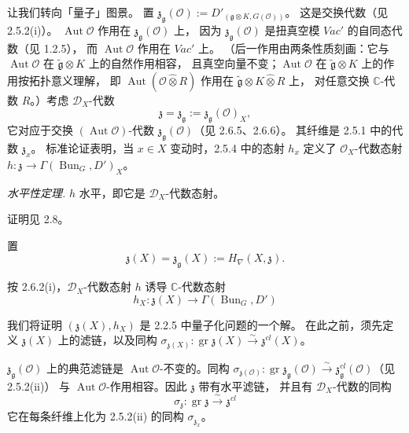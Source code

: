  让我们转向「量子」图景。
置 $\mathfrak{z}_{\mathfrak{g}}(\mathcal{O}):=D'_{(\mathfrak{g}\otimes K,G(\mathcal{O}))}$。
这是交换代数（见 2.5.2(i)）。
$\operatorname{Aut}\mathcal{O}$ 作用在 $\mathfrak{z}_{\mathfrak{g}}(\mathcal{O})$ 上，
因为 $\mathfrak{z}_{\mathfrak{g}}(\mathcal{O})$ 是扭真空模 $\mathit{Vac}'$ 的自同态代数（见 1.2.5），
而 $\operatorname{Aut}\mathcal{O}$ 作用在 $\mathit{Vac}'$ 上。
（后一作用由两条性质刻画：它与 $\operatorname{Aut}\mathcal{O}$ 在 $\tilde{\mathfrak{g}}\otimes K$ 上的自然作用相容，
且真空向量不变；$\operatorname{Aut}\mathcal{O}$ 在 $\tilde{\mathfrak{g}}\otimes K$ 上的作用按拓扑意义理解，
即 $\operatorname{Aut}(\mathcal{O}\hat{\otimes}R)$ 作用在 $\tilde{\mathfrak{g}}\otimes K\hat{\otimes}R$ 上，
对任意交换 $\mathbb{C}$-代数 $R$。）考虑 $\mathcal{D}_X$-代数
\[
\mathfrak{z}=\mathfrak{z}_{\mathfrak{g}}:=\mathfrak{z}_{\mathfrak{g}}(\mathcal{O})_X,
\]
它对应于交换 $(\operatorname{Aut}\mathcal{O})$-代数 $\mathfrak{z}_{\mathfrak{g}}(\mathcal{O})$（见 2.6.5、2.6.6）。
其纤维是 2.5.1 中的代数 $\mathfrak{z}_x$。
标准论证表明，当 $x\in X$ 变动时，2.5.4 中的态射 $h_x$ 定义了
$\mathcal{O}_X$-代数态射 $h: \mathfrak{z}\to\Gamma(\operatorname{Bun}_G,D')_X$。

\emph{水平性定理.} $h$ 水平，即它是 $\mathcal{D}_X$-代数态射。

证明见 2.8。

 置
\begin{equation}\tag{27}
\mathfrak{z}(X)=\mathfrak{z}_{\mathfrak{g}}(X):=H_\nabla(X,\mathfrak{z}).
\end{equation}


按 2.6.2(i)，$\mathcal{D}_X$-代数态射 $h$ 诱导 $\mathbb{C}$-代数态射
\[
  h_X:\mathfrak{z}(X)\longrightarrow\Gamma(\operatorname{Bun}_G,D')
\]

我们将证明 $(\mathfrak{z}(X),h_X)$ 是 2.2.5 中量子化问题的一个解。
在此之前，须先定义 $\mathfrak{z}(X)$ 上的滤链，以及同构
$\sigma_{\mathfrak{z}(X)}:\operatorname{gr}\mathfrak{z}(X)\xrightarrow{\sim}\mathfrak{z}^{cl}(X)$。

$\mathfrak{z}_{\mathfrak{g}}(\mathcal{O})$ 上的典范滤链是
$\operatorname{Aut}\mathcal{O}$-不变的。同构
$\sigma_{\mathfrak{z}(\mathcal{O})}:\operatorname{gr}\mathfrak{z}_{\mathfrak{g}}(\mathcal{O})
\xrightarrow{\sim}\mathfrak{z}^{cl}_{\mathfrak{g}}(\mathcal{O})$（见 2.5.2(ii)）
与 $\operatorname{Aut}\mathcal{O}$-作用相容。因此 $\mathfrak{z}$ 带有水平滤链，
并且有 $\mathcal{D}_X$-代数的同构
\[
  \sigma_{\mathfrak{z}}:\operatorname{gr}\mathfrak{z}\xrightarrow{\sim}\mathfrak{z}^{cl}
\]
它在每条纤维上化为 2.5.2(ii) 的同构 $\sigma_{\mathfrak{z}_x}$。

